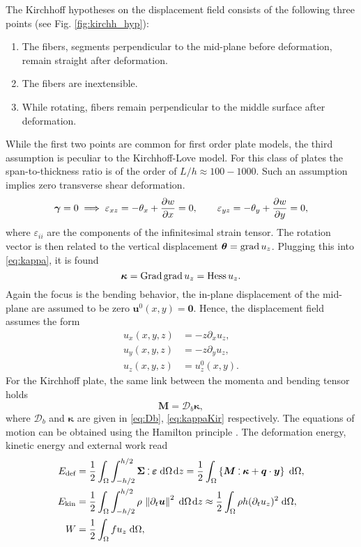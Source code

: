 The Kirchhoff hypotheses on the displacement field consists of the following three points (see Fig. \ref{fig:kirchh_hyp}):
\begin{enumerate}
\item The fibers, segments perpendicular to the mid-plane before deformation, remain straight after deformation.
\item The fibers are inextensible.
\item While rotating, fibers remain perpendicular to the
middle surface after deformation.
\end{enumerate}
While the first two points are common for first order plate models, the third assumption is  peculiar to the Kirchhoff-Love model. For this class of plates the span-to-thickness ratio is of the order of $L/h \approx 100 - 1000$. Such an assumption implies zero transverse shear deformation. 
\[
\bm{\gamma}=0 \implies \varepsilon_{xz}= - \theta_x + \diffp{w}{x} = 0, \qquad \varepsilon_{yz}=-\theta_y + \diffp{w}{y} = 0,
\]
where $\varepsilon_{ii}$ are the components of the infinitesimal strain tensor. The rotation vector is then related to the vertical displacement $\bm{\theta} = \operatorname*{grad} u_z$. Plugging this into \eqref{eq:kappa}, it is found
\begin{equation}\label{eq:kappaKir}
	\bm{\kappa} = \operatorname*{Grad} \operatorname*{grad} u_z = \operatorname*{Hess} u_z.
\end{equation}
Again the focus is the bending behavior, the in-plane displacement of the mid-plane are assumed to be zero $\bm{u}^0(x,y)=\bm{0}$. Hence, the displacement field assumes the form
\begin{equation}
\begin{aligned}
u_x(x,y,z) &= -z \partial_x {u_z}, \\
u_y(x,y,z) &= -z \partial_y {u_z}, \\
u_z(x,y,z) &= u_z^0(x,y).
\end{aligned}
\end{equation}
For the Kirchhoff plate, the same link between the momenta and bending tensor holds
\[ \bm{M} = \bm{\mathcal{D}}_b \bm{\kappa},
\] 
where $\bm{\mathcal{D}}_b$ and $\bm{\kappa}$ are given in \eqref{eq:Db}, \eqref{eq:kappaKir} respectively. The equations of motion can be obtained using the Hamilton principle \cite[Chapter 2]{reddy2006theory}. The deformation energy, kinetic energy and external work read
\begin{align*}
E_{\text{def}} &= \frac{1}{2} \int_{\Omega} \int_{-h/2}^{h/2} \bm{\Sigma} \cddot \bm{\varepsilon} \d{\Omega} \d{z} = \frac{1}{2} \int_{\Omega} \left\{\bm{M} \cddot \bm{\kappa} + \bm{q} \cdot \bm{y} \right\}\d{\Omega}, \\
E_{\text{kin}} &= \frac{1}{2}  \int_{\Omega} \int_{-h/2}^{h/2} \rho \, \norm{\partial_t \bm{u}}^2 \d{\Omega} \d{z} \approx \frac{1}{2} \int_{\Omega} \rho h (\partial_t u_z)^2  \d{\Omega}, \\
W &= \frac{1}{2}  \int_{\Omega} f u_z \d{\Omega},
\end{align*}
